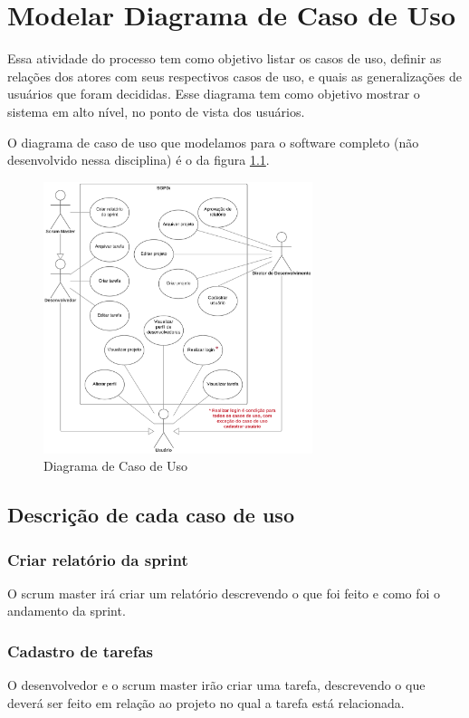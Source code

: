 \chapter{Modelar Diagrama de Caso de Uso}

Essa atividade do processo tem como objetivo listar os casos de uso, definir as relações dos atores com seus respectivos casos de uso, e quais as generalizações de usuários que foram decididas. Esse diagrama tem como objetivo mostrar o sistema em alto nível, no ponto de vista dos usuários.

O diagrama de caso de uso que modelamos para o software completo (não desenvolvido nessa disciplina) é o da figura \ref{fig:diagrama-caso-uso}.

\begin{figure}[H]
  \center
  \includegraphics[width=0.7\textwidth]{figuras/diagrama-caso-uso.png}
  \caption{Diagrama de Caso de Uso}
  \label{fig:diagrama-caso-uso}
\end{figure}

\section{Descrição de cada caso de uso}

\subsection{Criar relatório da sprint}
  O scrum master irá criar um relatório descrevendo o que foi feito e como foi o andamento da sprint.
\subsection{Cadastro de tarefas}
  O desenvolvedor e o scrum master irão criar uma tarefa, descrevendo o que deverá ser feito em relação ao projeto no qual a tarefa está relacionada.
